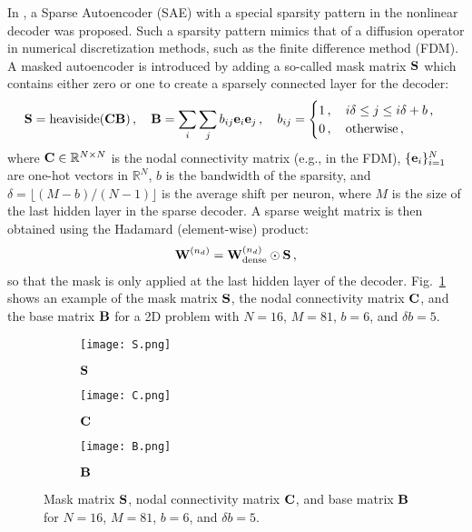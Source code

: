In \cite{kim2022fast}, a Sparse Autoencoder (SAE) with a special sparsity pattern in the nonlinear decoder was proposed. Such a sparsity pattern mimics that of a diffusion operator in numerical discretization methods, such as the finite difference method (FDM). A masked autoencoder is introduced by adding a so-called mask matrix $\btS$ which contains either zero or one to create a sparsely connected layer for the decoder: 
\begin{align}\label{eq: shallow mask}
    \textbf{S} = \operatorname{heaviside}(\textbf{C} \textbf{B})\,, \quad \textbf{B} = \sum_i \sum_j b_{ij} \textbf{e}_i \textbf{e}_j\,, \quad b_{ij} = \begin{cases}
        1\,, \quad i \delta \leq j \leq i \delta + b\,, \\
        0\,, \quad \text{otherwise}\,,
    \end{cases}
\end{align}
where $\textbf{C} \in \mathbb{R}^{N \times N}$ is the nodal connectivity matrix (e.g., in the FDM), $\{\textbf{e}_i\}_{i = 1}^N$ are one-hot vectors in $\mathbb{R}^N$, $b$ is the bandwidth of the sparsity, and $\delta = \lfloor (M - b) / (N - 1) \rfloor$ is the average shift per neuron, where $M$ is the size of the last hidden layer in the sparse decoder. A sparse weight matrix is then obtained using the Hadamard (element-wise) product:
\begin{align}
    \textbf{W}^{(n_d)} = \textbf{W}^{(n_d)}_{\text{dense}} \odot \textbf{S}\,,
\end{align}
so that the mask is only applied at the last hidden layer of the decoder. Fig.~\ref{fig: S,C,B} shows an example of the mask matrix $\btS$, the nodal connectivity matrix $\btC$, and the base matrix $\btB$ for a 2D problem with $N = 16$, $M = 81$, $b = 6$, and $\delta b = 5$.
\begin{figure}[!htb]
  \begin{center}
    \begin{subfigure}[b]{0.4\textwidth}
        \begin{center}
            \texttt{[image: S.png]}
        \end{center}
        \caption{$\btS$}
      \end{subfigure}
      \begin{subfigure}[b]{0.172\textwidth}
        \begin{center}
            \texttt{[image: C.png]}
        \end{center}
        \caption{$\btC$}
      \end{subfigure}
      \begin{subfigure}[b]{0.4\textwidth}
        \begin{center}
            \texttt{[image: B.png]}
        \end{center}
        \caption{$\btB$}
      \end{subfigure}
  \end{center}
  \caption[Mask matrix $\btS$, nodal connectivity matrix $\btC$, and base matrix $\btB$.]{Mask matrix $\btS$, nodal connectivity matrix $\btC$, and base matrix $\btB$ for $N = 16$, $M = 81$, $b = 6$, and $\delta b = 5$.}
  \label{fig: S,C,B}
\end{figure}

